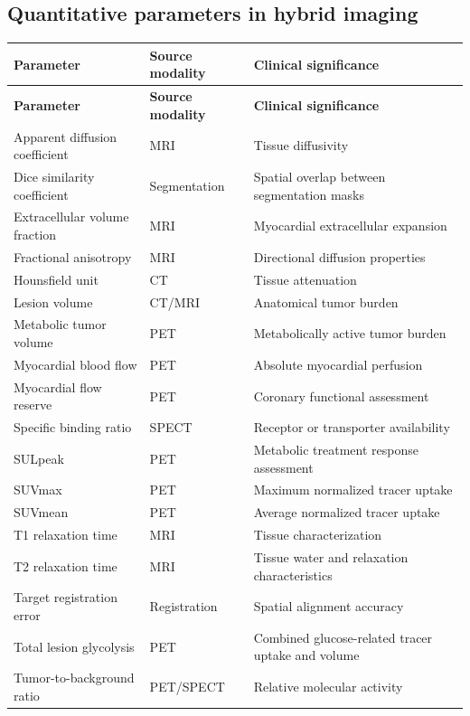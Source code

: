 \subsection{Quantitative parameters in hybrid imaging}
\begin{longtable}{@{}p{}p{}p{}@{}}
\toprule
\textbf{Parameter} & \textbf{Source modality} & \textbf{Clinical significance} \\
\midrule
\endfirsthead
\toprule
\textbf{Parameter} & \textbf{Source modality} & \textbf{Clinical significance} \\
\midrule
\endhead
Apparent diffusion coefficient & MRI & Tissue diffusivity \\
Dice similarity coefficient & Segmentation & Spatial overlap between segmentation masks \\
Extracellular volume fraction & MRI & Myocardial extracellular expansion \\
Fractional anisotropy & MRI & Directional diffusion properties \\
Hounsfield unit & CT & Tissue attenuation \\
Lesion volume & CT/MRI & Anatomical tumor burden \\
Metabolic tumor volume & PET & Metabolically active tumor burden \\
Myocardial blood flow & PET & Absolute myocardial perfusion \\
Myocardial flow reserve & PET & Coronary functional assessment \\
Specific binding ratio & SPECT & Receptor or transporter availability \\
SULpeak & PET & Metabolic treatment response assessment \\
SUVmax & PET & Maximum normalized tracer uptake \\
SUVmean & PET & Average normalized tracer uptake \\
T1 relaxation time & MRI & Tissue characterization \\
T2 relaxation time & MRI & Tissue water and relaxation characteristics \\
Target registration error & Registration & Spatial alignment accuracy \\
Total lesion glycolysis & PET & Combined glucose-related tracer uptake and volume \\
Tumor-to-background ratio & PET/SPECT & Relative molecular activity \\
\bottomrule
\end{longtable}

